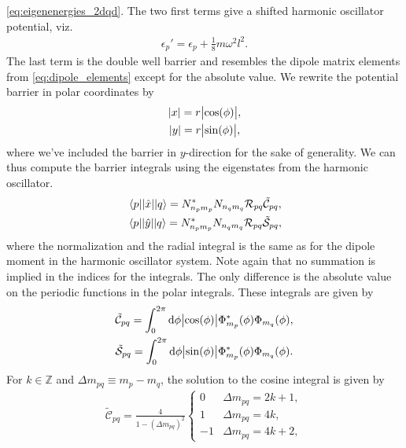         \autoref{eq:eigenenergies_2dqd}.
        The two first terms give a shifted harmonic oscillator potential, viz.
        \begin{align}
            \epsilon_p' = \epsilon_p + \frac{1}{8} m \omega^2 l^2.
        \end{align}
        The last term is the double well barrier and resembles the dipole matrix
        elements from \autoref{eq:dipole_elements} except for the absolute
        value.
        We rewrite the potential barrier in polar coordinates by
        \begin{gather}
            \abs{x} = r\abs{\cos(\phi)}, \\
            \abs{y} = r\abs{\sin(\phi)},
        \end{gather}
        where we've included the barrier in $y$-direction for the sake of
        generality.
        We can thus compute the barrier integrals using the eigenstates from the
        harmonic oscillator.
        \begin{gather}
            \mel{p}{\abs{\position}}{q}
            =
            N^{*}_{n_p m_p} N_{n_q m_q}
            \mathcal{R}_{pq} \tilde{\mathcal{C}}_{pq},
            \\
            \mel{p}{\abs{\position[y]}}{q}
            =
            N^{*}_{n_p m_p} N_{n_q m_q}
            \mathcal{R}_{pq} \tilde{\mathcal{S}}_{pq},
        \end{gather}
        where the normalization and the radial integral is the same as for the
        dipole moment in the harmonic oscillator system.
        Note again that no summation is implied in the indices for the
        integrals.
        The only difference is the absolute value on the periodic functions in
        the polar integrals.
        These integrals are given by
        \begin{gather}
            \tilde{\mathcal{C}}_{pq}
            =
            \int_{0}^{2\pi} \dd \phi
            \abs{\cos(\phi)}
            \Phi^{*}_{m_p}(\phi)
            \Phi_{m_q}(\phi),
            \\
            \tilde{\mathcal{S}}_{pq}
            =
            \int_{0}^{2\pi} \dd \phi
            \abs{\sin(\phi)}
            \Phi^{*}_{m_p}(\phi)
            \Phi_{m_q}(\phi).
        \end{gather}
        For $k \in \mathbb{Z}$ and $\Delta m_{pq} \equiv m_p - m_q$, the
        solution to the cosine integral is given by
        \begin{align}
            \tilde{\mathcal{C}}_{pq}
            =
            \frac{4}{1 - (\Delta m_{pq})^2}
            \begin{cases}
                0 & \Delta m_{pq} = 2k + 1, \\
                1 & \Delta m_{pq} = 4k, \\
                -1 & \Delta m_{pq} = 4k + 2,
            \end{cases}
        \end{align}
